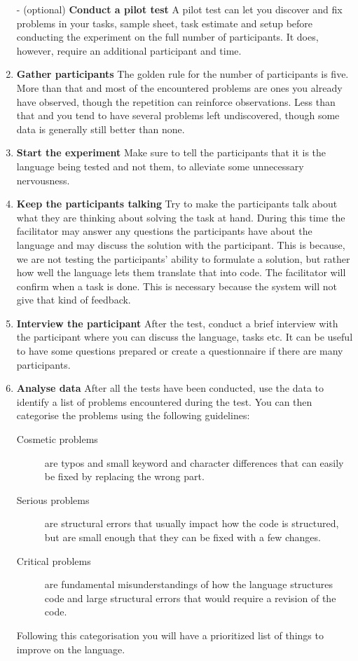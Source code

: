\documentclass[10pt]{sigplanconf}
\begin{document}
\begin{enumerate}
\item[-] (optional) \textbf{Conduct a pilot test} A pilot test can let you discover and fix problems in your tasks, sample sheet, task estimate and setup before conducting the experiment on the full number of participants. It does, however, require an additional participant and time.
\item \textbf{Gather participants} The golden rule for the number of participants is five. More than that and most of the encountered problems are ones you already have observed, though the repetition can reinforce observations. Less than that and you tend to have several problems left undiscovered, though some data is generally still better than none.
\item \textbf{Start the experiment} Make sure to tell the participants that it is the language being tested and not them, to alleviate some unnecessary nervousness.
\item \textbf{Keep the participants talking} Try to make the participants talk about what they are thinking about solving the task at hand. During this time the facilitator may answer any questions the participants have about the language and may discuss the solution with the participant. This is because, we are not testing the participants' ability to formulate a solution, but rather how well the language lets them translate that into code. The facilitator will confirm when a task is done. This is necessary because the system will not give that kind of feedback.
\item \textbf{Interview the participant} After the test, conduct a brief interview with the participant where you can discuss the language, tasks etc. It can be useful to have some questions prepared or create a questionnaire if there are many participants.
\item \textbf{Analyse data} After all the tests have been conducted, use the data to identify a list of problems encountered during the test. You can then categorise the problems using the following guidelines:
\begin{description}
\item[Cosmetic problems] are typos and small keyword and character differences that can easily be fixed by replacing the wrong part.
\item[Serious problems] are structural errors that usually impact how the code is structured, but are small enough that they can be fixed with a few changes.
\item[Critical problems] are fundamental misunderstandings of how the language structures code and large structural errors that would require a revision of the code.
\end{description}
Following this categorisation you will have a prioritized list of things to improve on the language.
\end{enumerate}
\end{document}
